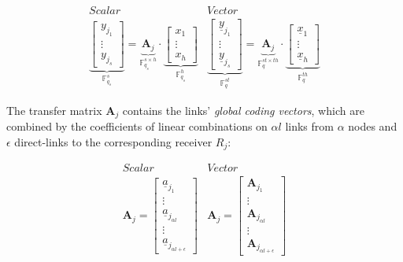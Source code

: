 \begin{equation}
\begin{array}{c|c}
Scalar & Vector\\
\underset{\ensuremath{\mathbb{F}}_{q_{s}}^{s}}{\underbrace{\left[\begin{array}{c}
y_{j_{1}}\\
\vdots\\
y_{j_{s}}
\end{array}\right]}}=\underset{\ensuremath{\mathbb{F}}_{q_{s}}^{s\times h}}{\underbrace{\boldsymbol{A}_{j}}}\cdot\underset{\ensuremath{\mathbb{F}}_{q_{s}}^{h}}{\underbrace{\left[\begin{array}{c}
x_{1}\\
\vdots\\
x_{h}
\end{array}\right]}} & \underset{\ensuremath{\mathbb{F}}_{q}^{st}}{\underbrace{\left[\begin{array}{c}
\underline{y}_{j_{1}}\\
\vdots\\
\underline{y}_{j_{s}}
\end{array}\right]}}=\underset{\ensuremath{\mathbb{F}}_{q}^{st\times th}}{\underbrace{\boldsymbol{A}_{j}}}\cdot\underset{\ensuremath{\mathbb{F}}_{q}^{th}}{\underbrace{\left[\begin{array}{c}
\underline{x}_{1}\\
\vdots\\
\underline{x}_{h}
\end{array}\right]}}
\end{array}\label{eq:linear_system}
\end{equation}

The transfer matrix $\boldsymbol{A}_{j}$ contains the links' \textit{global
coding vectors}, which are combined by the coefficients of linear
combinations on $\alpha l$ links from $\alpha$ nodes and $\epsilon$
direct-links to the corresponding receiver $R_{j}$:

\[
\begin{array}{c|c}
Scalar & Vector\\
\boldsymbol{A}_{j}=\left[\begin{array}{c}
\underline{a}_{j_{1}}\\
\vdots\\
\underline{a}_{j_{\alpha l}}\\
\vdots\\
\underline{a}_{j_{\alpha l+\epsilon}}
\end{array}\right] & \boldsymbol{A}_{j}=\left[\begin{array}{c}
\boldsymbol{A}_{j_{1}}\\
\vdots\\
\boldsymbol{A}_{j_{\alpha l}}\\
\vdots\\
\boldsymbol{A}_{j_{\alpha l+\epsilon}}
\end{array}\right]
\end{array}
\]

